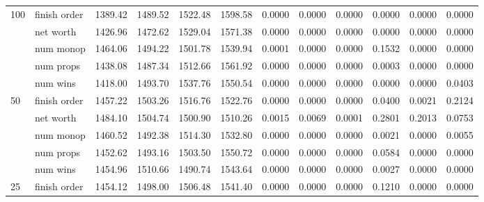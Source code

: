 \begin{landscape}
\begin{table}[ht]
\begin{tabularx}{\linewidth}{|p{1in}|p{1in}|r|r|r|r|r|r|r|r|r|r|}
      \multirow{5}{*}{100} & finish order & 1389.42 & 1489.52 & \cellcolor{green!55!white}1522.48 & \cellcolor{green!55!white}1598.58 & 0.0000 & 0.0000 & 0.0000 & 0.0000 & 0.0000 & 0.0000 \\
\cline{2-12}      & net worth & 1426.96 & 1472.62 & \cellcolor{green!55!white}1529.04 & \cellcolor{green!55!white}1571.38 & 0.0000 & 0.0000 & 0.0000 & 0.0000 & 0.0000 & 0.0000 \\
\cline{2-12}      & num monop & 1464.06 & 1494.22 & \cellcolor{green!55!white}1501.78 & \cellcolor{green!55!white}1539.94 & 0.0001 & 0.0000 & 0.0000 & \cellcolor{red!55!white}0.1532 & 0.0000 & 0.0000 \\
\cline{2-12}      & num props & 1438.08 & 1487.34 & \cellcolor{green!55!white}1512.66 & \cellcolor{green!55!white}1561.92 & 0.0000 & 0.0000 & 0.0000 & 0.0003 & 0.0000 & 0.0000 \\
\cline{2-12}      & num wins & 1418.00 & 1493.70 & \cellcolor{green!55!white}1537.76 & \cellcolor{green!55!white}1550.54 & 0.0000 & 0.0000 & 0.0000 & 0.0000 & 0.0000 & \cellcolor{red!55!white}0.0403 \\
      \cline{1-12}
      \multirow{5}{*}{50} & finish order & 1457.22 & \cellcolor{green!55!white}1503.26 & \cellcolor{green!55!white}1516.76 & \cellcolor{green!55!white}1522.76 & 0.0000 & 0.0000 & 0.0000 & \cellcolor{red!55!white}0.0400 & 0.0021 & \cellcolor{red!55!white}0.2124 \\
\cline{2-12}      & net worth & 1484.10 & \cellcolor{green!55!white}1504.74 & \cellcolor{green!55!white}1500.90 & \cellcolor{green!55!white}1510.26 & 0.0015 & 0.0069 & 0.0001 & \cellcolor{red!55!white}0.2801 & \cellcolor{red!55!white}0.2013 & \cellcolor{red!55!white}0.0753 \\
\cline{2-12}      & num monop & 1460.52 & 1492.38 & \cellcolor{green!55!white}1514.30 & \cellcolor{green!55!white}1532.80 & 0.0000 & 0.0000 & 0.0000 & 0.0021 & 0.0000 & 0.0055 \\
\cline{2-12}      & num props & 1452.62 & 1493.16 & \cellcolor{green!55!white}1503.50 & \cellcolor{green!55!white}1550.72 & 0.0000 & 0.0000 & 0.0000 & \cellcolor{red!55!white}0.0584 & 0.0000 & 0.0000 \\
\cline{2-12}      & num wins & 1454.96 & \cellcolor{green!55!white}1510.66 & 1490.74 & \cellcolor{green!55!white}1543.64 & 0.0000 & 0.0000 & 0.0000 & 0.0027 & 0.0000 & 0.0000 \\
      \cline{1-12}
      \multirow{5}{*}{25} & finish order & 1454.12 & 1498.00 & \cellcolor{green!55!white}1506.48 & \cellcolor{green!55!white}1541.40 & 0.0000 & 0.0000 & 0.0000 & \cellcolor{red!55!white}0.1210 & 0.0000 & 0.0000 \\

\end{tabularx}
\end{table}
\end{landscape}
